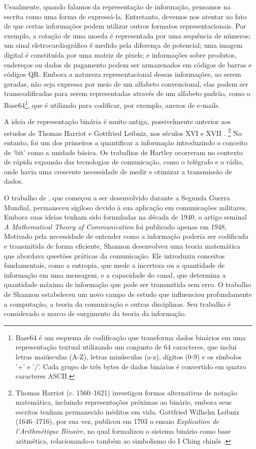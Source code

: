 Usualmente, quando falamos da representação de informação, pensamos na escrita
como uma forma de expressá-la. Entretanto, devemos nos atentar ao fato de que
certas informações podem utilizar outros formatos representacionais. Por
exemplo, a cotação de uma moeda é representada por uma sequência de números; um
sinal eletrocardiográfico é medido pela diferença de potencial; uma imagem
digital é constituída por uma matriz de pixels; e informações sobre produtos,
endereços ou dados de pagamento podem ser armazenados em códigos de barras e
códigos QR.  Embora a natureza representacional dessas informações, ao serem
geradas, não seja expressa por meio de um alfabeto convencional, elas podem ser
transcodificadas para serem representadas através de um alfabeto padrão, como o
Base64\footnote{Base64 é um esquema de codificação que transforma dados
    binários em uma representação textual utilizando um conjunto de 64
    caracteres, que inclui letras maiúsculas (A-Z), letras minúsculas (a-z),
    dígitos (0-9) e os símbolos '+' e '/'. Cada grupo de três bytes de dados
binários é convertido em quatro caracteres ASCII.}, que é utilizado para
codificar, por exemplo, anexos de e-mails.

A ideia de representação binária é muito antiga, possivelmente anterior 
aos estudos de Thomas Harriot e Gottfried Leibniz, nos séculos XVI e XVII \parencite{shirley1951}.
\footnote{Thomas Harriot (c. 1560–1621) investigou formas alternativas de
notação matemática, incluindo representações próximas ao binário, embora seus
escritos tenham permanecido inéditos em vida. Gottfried Wilhelm Leibniz
(1646–1716), por sua vez, publicou em 1703 o ensaio \textit{Explication de
l'Arithmétique Binaire}, no qual formalizou o sistema binário como base
aritmética, relacionando-o também ao simbolismo do I Ching chinês \parencite{shirley1951,Zandonade2024}.}
No entanto,
\textcite{hartley1928} foi um dos primeiros a quantificar a informação 
introduzindo o conceito de `bit' como a unidade básica. 
Os trabalhos de Hartley ocorreram no contexto de rápida expansão das
tecnologias de comunicação, como o telégrafo e o rádio, onde havia uma
crescente necessidade de medir e otimizar a transmissão de dados.

O trabalho de \textcite{shannon1948}, que começou a ser desenvolvido durante a
Segunda Guerra Mundial, permaneceu sigiloso devido à sua aplicação em
comunicações militares. Embora suas ideias tenham sido formuladas na década de
1940, o artigo seminal \emph{A Mathematical Theory of Communication} foi
publicado apenas em 1948. Motivado pela necessidade de entender como a
informação poderia ser codificada e transmitida de forma eficiente, Shannon
desenvolveu uma teoria matemática que abordava questões práticas da
comunicação. Ele introduziu conceitos fundamentais, como a entropia, que mede a
incerteza ou a quantidade de informação em uma mensagem, e a capacidade do
canal, que determina a quantidade máxima de informação que pode ser transmitida
sem erro. O trabalho de Shannon estabeleceu um novo campo de estudo que
influenciou profundamente a computação, a teoria da comunicação e outras
disciplinas. Seu trabalho é considerado o marco de surgimento da teoria da
informação.

